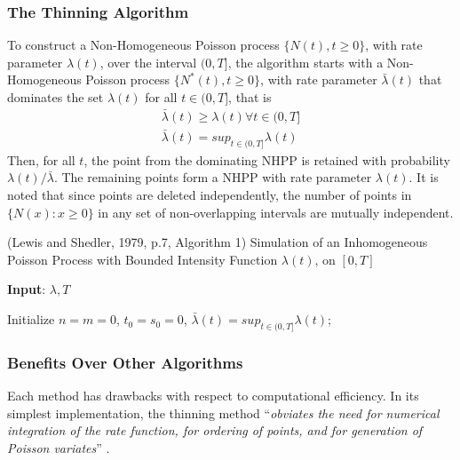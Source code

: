\documentclass[%
 reprint,
 amsmath,amssymb,
 aps,
]{revtex4-2}
\theoremstyle{definition}
\begin{document}
\subsubsection{The Thinning Algorithm}
To construct a Non-Homogeneous Poisson process $\{N(t) , t \ge 0 \}$, with rate parameter $\lambda(t)$, over the interval $(0,T]$, the algorithm starts with a Non-Homogeneous Poisson process $\{N^{*}(t) , t \ge 0 \}$, with rate parameter $\bar{\lambda}(t)$ that dominates the set $\lambda(t)$ for all $t \in (0,T]$, that is 
\begin{gather*}
\bar{\lambda}(t) \ge \lambda(t) \forall t \in (0,T]\\
\bar{\lambda}(t) = sup_{t\in(0,T]}\lambda(t)
\end{gather*}
Then, for all $t$, the point from the dominating NHPP is retained with probability $\lambda(t)/\bar{\lambda}$. The remaining points form a NHPP with rate parameter $\lambda(t)$. It is noted that since points are deleted independently, the number of points in $\{N(x) : x \ge 0\}$ in any set of non-overlapping intervals are mutually independent.

\begin{algorithm}
\label{alg:1}
\caption{(Lewis and Shedler, 1979, p.7, Algorithm 1) Simulation of an Inhomogeneous Poisson Process with Bounded Intensity Function $\lambda(t)$, on $[0, T]$}
\textbf{Input}: $\lambda,T$

Initialize $n = m = 0$, $t_0 = s_0 = 0$, $\bar{\lambda}(t) = sup_{t\in(0,T]}\lambda(t)$;

\end{algorithm}

\subsubsection{Benefits Over Other Algorithms}
Each method has drawbacks with respect to computational efficiency. In its simplest implementation, the thinning method ``\textit{obviates the need for numerical integration of the rate function, for ordering of points, and for generation of Poisson variates}'' \cite{lewis_shedler_1979}. 
\end{document}
